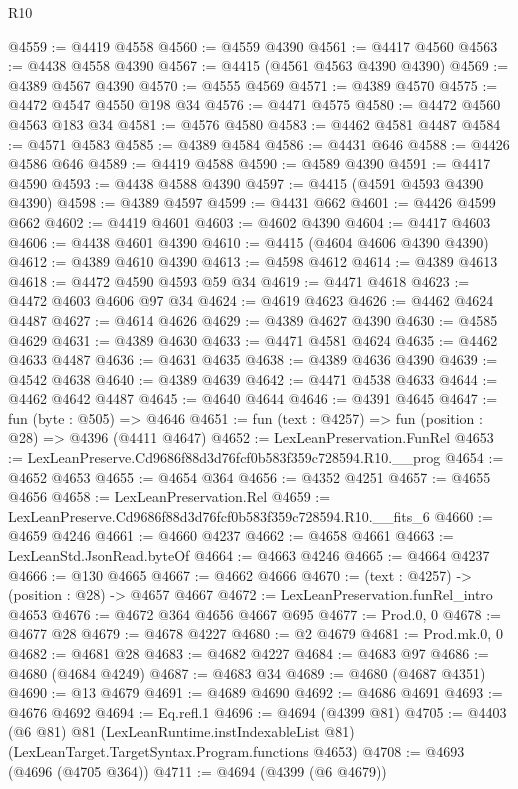 \begin{lexlean}{R10}
\begin{coremodule}
@4559 := @4419 @4558
@4560 := @4559 @4390
@4561 := @4417 @4560
@4563 := @4438 @4558 @4390
@4567 := @4415 (@4561 @4563 @4390 @4390)
@4569 := @4389 @4567 @4390
@4570 := @4555 @4569
@4571 := @4389 @4570
@4575 := @4472 @4547 @4550 @198 @34
@4576 := @4471 @4575
@4580 := @4472 @4560 @4563 @183 @34
@4581 := @4576 @4580
@4583 := @4462 @4581 @4487
@4584 := @4571 @4583
@4585 := @4389 @4584
@4586 := @4431 @646
@4588 := @4426 @4586 @646
@4589 := @4419 @4588
@4590 := @4589 @4390
@4591 := @4417 @4590
@4593 := @4438 @4588 @4390
@4597 := @4415 (@4591 @4593 @4390 @4390)
@4598 := @4389 @4597
@4599 := @4431 @662
@4601 := @4426 @4599 @662
@4602 := @4419 @4601
@4603 := @4602 @4390
@4604 := @4417 @4603
@4606 := @4438 @4601 @4390
@4610 := @4415 (@4604 @4606 @4390 @4390)
@4612 := @4389 @4610 @4390
@4613 := @4598 @4612
@4614 := @4389 @4613
@4618 := @4472 @4590 @4593 @59 @34
@4619 := @4471 @4618
@4623 := @4472 @4603 @4606 @97 @34
@4624 := @4619 @4623
@4626 := @4462 @4624 @4487
@4627 := @4614 @4626
@4629 := @4389 @4627 @4390
@4630 := @4585 @4629
@4631 := @4389 @4630
@4633 := @4471 @4581 @4624
@4635 := @4462 @4633 @4487
@4636 := @4631 @4635
@4638 := @4389 @4636 @4390
@4639 := @4542 @4638
@4640 := @4389 @4639
@4642 := @4471 @4538 @4633
@4644 := @4462 @4642 @4487
@4645 := @4640 @4644
@4646 := @4391 @4645
@4647 := fun (byte : @505) => @4646
@4651 := fun (text : @4257) => fun (position : @28) => @4396 (@4411 @4647)
@4652 := LexLeanPreservation.FunRel
@4653 := LexLeanPreserve.Cd9686f88d3d76fcf0b583f359c728594.R10.__prog
@4654 := @4652 @4653
@4655 := @4654 @364
@4656 := @4352 @4251
@4657 := @4655 @4656
@4658 := LexLeanPreservation.Rel
@4659 := LexLeanPreserve.Cd9686f88d3d76fcf0b583f359c728594.R10.__fits_6
@4660 := @4659 @4246
@4661 := @4660 @4237
@4662 := @4658 @4661
@4663 := LexLeanStd.JsonRead.byteOf
@4664 := @4663 @4246
@4665 := @4664 @4237
@4666 := @130 @4665
@4667 := @4662 @4666
@4670 := (text : @4257) -> (position : @28) -> @4657 @4667
@4672 := LexLeanPreservation.funRel_intro @4653
@4676 := @4672 @364 @4656 @4667 @695
@4677 := Prod.{0, 0}
@4678 := @4677 @28
@4679 := @4678 @4227
@4680 := @2 @4679
@4681 := Prod.mk.{0, 0}
@4682 := @4681 @28
@4683 := @4682 @4227
@4684 := @4683 @97
@4686 := @4680 (@4684 @4249)
@4687 := @4683 @34
@4689 := @4680 (@4687 @4351)
@4690 := @13 @4679
@4691 := @4689 @4690
@4692 := @4686 @4691
@4693 := @4676 @4692
@4694 := Eq.refl.{1}
@4696 := @4694 (@4399 @81)
@4705 := @4403
    (@6 @81)
    @81
    (LexLeanRuntime.instIndexableList @81)
    (LexLeanTarget.TargetSyntax.Program.functions @4653)
@4708 := @4693 (@4696 (@4705 @364))
@4711 := @4694 (@4399 (@6 @4679))

\end{coremodule}
\end{lexlean}
